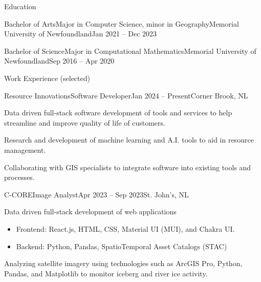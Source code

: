 \documentclass[]{Keenan-Nicholson-Resume}
\begin{document}
\resumeheader
{}
{}
{}
{}
{}

\begin{section}{Education}
    \begin{subsection}{Bachelor of Arts}{Major in Computer Science, minor in Geography}{Memorial University of Newfoundland}{Jan 2021 -- Dec 2023}
    \end{subsection}
    \begin{subsection}{Bachelor of Science}{Major in Computational Mathematics}{Memorial University of Newfoundland}{Sep 2016 -- Apr 2020}
    \end{subsection}
\end{section}

\begin{section}{Work Experience (selected)}
    \begin{subsection}{Resource Innovations}{Software Developer}{Jan 2024 -- Present}{Corner Brook, NL}
        \item Data driven full-stack software development of tools and services to help streamline and improve quality of life of customers.
        \item Research and development of machine learning and A.I. tools to aid in resource management.
        \item Collaborating with GIS specialists to integrate software into existing tools and processes.
    \end{subsection}
    \begin{subsection}{C-CORE}{Image Analyst}{Apr 2023 -- Sep 2023}{St. John's, NL}
        \item Data driven full-stack development of web applications
        \vspace{-4pt}
            \begin{itemize}[itemsep=-6.5pt]
                \item Frontend: React.js, HTML, CSS, Material UI (MUI), and Chakra UI.
                \item Backend: Python, Pandas, SpatioTemporal Asset Catalogs (STAC)
            \end{itemize}
        \vspace{1pt}
        \item Analyzing satellite imagery using technologies such as ArcGIS Pro, Python, Pandas, and Matplotlib to \newline monitor iceberg and river ice activity.
    \end{subsection}
\end{section}
\end{document}
